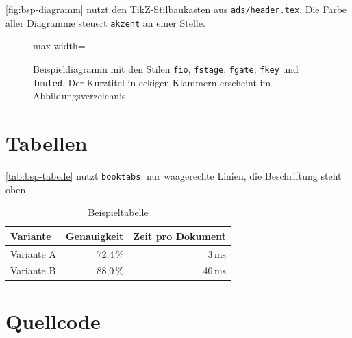 \autoref{fig:bsp-diagramm} nutzt den TikZ-Stilbaukasten aus \texttt{ads/header.tex}.
Die Farbe aller Diagramme steuert \texttt{akzent} an einer Stelle.

\begin{figure}[htbp]
  \centering
  \begin{adjustbox}{max width=\textwidth}
  \end{adjustbox}
  \caption[Beispieldiagramm]{Beispieldiagramm mit den Stilen \texttt{fio}, \texttt{fstage}, \texttt{fgate}, \texttt{fkey} und \texttt{fmuted}. Der Kurztitel in eckigen Klammern erscheint im Abbildungsverzeichnis.}
  \label{fig:bsp-diagramm}
\end{figure}

\section{Tabellen}\label{sec:bsp-tabellen}

\autoref{tab:bsp-tabelle} nutzt \texttt{booktabs}: nur waagerechte Linien, die Beschriftung steht oben.

\begin{table}[htbp]
  \centering
  \caption{Beispieltabelle}
  \label{tab:bsp-tabelle}
  \begin{tabular}{lrr}
    \toprule
    Variante & Genauigkeit & Zeit pro Dokument \\
    \midrule
    Variante A & 72,4\,\% & 3\,ms \\
    Variante B & 88,0\,\% & 40\,ms \\
    \bottomrule
  \end{tabular}
\end{table}

\section{Quellcode}\label{sec:bsp-quellcode}

